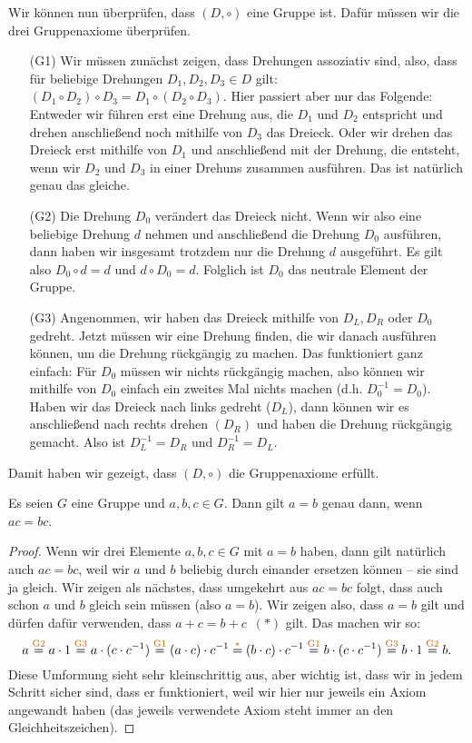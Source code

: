 \documentclass[../../main.tex]{subfiles}
\begin{document}
\begin{advexample}
    Wir können nun überprüfen, dass $(D,\circ)$ eine Gruppe ist. Dafür müssen wir die drei Gruppenaxiome überprüfen.
    \begin{enumerate}
        \item[(G1)] Wir müssen zunächst zeigen, dass Drehungen assoziativ sind, also, dass für beliebige Drehungen $D_1,D_2,D_3\in D$ gilt: $(D_1\circ D_2)\circ D_3=D_1\circ (D_2\circ D_3)$. Hier passiert aber nur das Folgende: Entweder wir führen erst eine Drehung aus, die $D_1$ und $D_2$ entspricht und drehen anschließend noch mithilfe von $D_3$ das Dreieck. Oder wir drehen das Dreieck erst mithilfe von $D_1$ und anschließend mit der Drehung, die entsteht, wenn wir $D_2$ und $D_3$ in einer Drehuns zusammen ausführen. Das ist natürlich genau das gleiche.
        \item[(G2)] Die Drehung $D_0$ verändert das Dreieck nicht. Wenn wir also eine beliebige Drehung $d$ nehmen und anschließend die Drehung $D_0$ ausführen, dann haben wir insgesamt trotzdem nur die Drehung $d$ ausgeführt. Es gilt also $D_0\circ d=d$ und $d\circ D_0=d$. Folglich ist $D_0$ das neutrale Element der Gruppe.
        \item[(G3)] Angenommen, wir haben das Dreieck mithilfe von $D_L, D_R$ oder $D_0$ gedreht. Jetzt müssen wir eine Drehung finden, die wir danach ausführen können, um die Drehung rückgängig zu machen. Das funktioniert ganz einfach: Für $D_0$ müssen wir nichts rückgängig machen, also können wir mithilfe von $D_0$ einfach ein zweites Mal nichts machen (d.h. $D_0^{-1}=D_0$). Haben wir das Dreieck nach links gedreht ($D_L$), dann können wir es anschließend nach rechts drehen $(D_R)$ und haben die Drehung rückgängig gemacht. Also ist $D_L^{-1}=D_R$ und $D_R^{-1}=D_L$.
    \end{enumerate}
    Damit haben wir gezeigt, dass $(D,\circ)$ die Gruppenaxiome erfüllt.
\end{advexample}

\begin{theorem}[Kürzungsregel]
    Es seien $G$ eine Gruppe und $a,b,c \in G$. Dann gilt $a=b$ genau dann, wenn $ac=bc$.
\end{theorem}
\begin{proof}
     Wenn wir drei Elemente $a,b,c \in G$ mit $a=b$ haben, dann gilt natürlich auch $ac=bc$, weil wir $a$ und $b$ beliebig durch einander ersetzen können -- sie sind ja gleich. Wir zeigen als nächstes, dass umgekehrt aus $ac=bc$ folgt, dass auch schon $a$ und $b$ gleich sein müssen (also $a=b$). Wir zeigen also, dass $a=b$ gilt und dürfen dafür verwenden, dass \mbox{$a+c=b+c$ \textcolor{orange!75!black}{$(*)$}} gilt. Das machen wir so:
    \[a\axiom{G2}a\cdot 1\axiom{G3}a\cdot(c\cdot c^{-1})\axiom{G1}(a\cdot c)\cdot c^{-1}\axiom{$*$}(b\cdot c)\cdot c^{-1}\axiom{G1}b\cdot (c\cdot c^{-1})\axiom{G3}b\cdot 1\axiom{G2}b.\]
    Diese Umformung sieht sehr kleinschrittig aus, aber wichtig ist, dass wir in jedem Schritt sicher sind, dass er funktioniert, weil wir hier nur jeweils ein Axiom angewandt haben (das jeweils verwendete Axiom steht immer an den Gleichheitszeichen).
    
\end{proof}

\newpage
\pagecolor{white}
\end{document}
